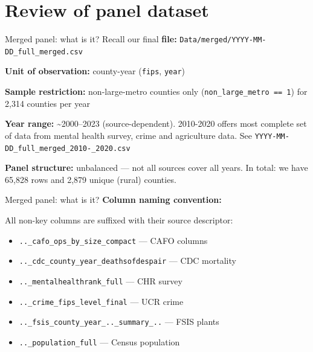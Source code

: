\documentclass[aspectratio=169]{beamer}
\begin{document}
\section{Review of panel dataset}


\begin{frame}{Merged panel: what is it?}
Recall our final \textbf{file:} \texttt{Data/merged/YYYY-MM-DD\_full\_merged.csv}

\vspace{0.5em}
\textbf{Unit of observation:} county-year (\texttt{fips}, \texttt{year})



\textbf{Sample restriction:} non-large-metro counties only (\texttt{non\_large\_metro == 1}) for 2,314 counties per year 

\textbf{Year range:} \textasciitilde2000--2023 (source-dependent). 2010-2020 offers most complete set of data from mental health survey, crime and agriculture data. See \texttt{YYYY-MM-DD\_full\_merged\_2010-\_2020.csv}

\textbf{Panel structure:} unbalanced — not all sources cover all years. In total: we have 65,828 rows and 2,879 unique (rural) counties.



\end{frame}


\begin{frame}{Merged panel: what is it?}
\textbf{Column naming convention:}

All non-key columns are suffixed with their source descriptor:
\begin{itemize}\small
    \item \texttt{..\_cafo\_ops\_by\_size\_compact} — CAFO columns
    \item \texttt{..\_cdc\_county\_year\_deathsofdespair} — CDC mortality
    \item \texttt{..\_mentalhealthrank\_full} — CHR survey
    \item \texttt{..\_crime\_fips\_level\_final} — UCR crime
    \item \texttt{..\_fsis\_county\_year\_..\_summary\_..} — FSIS plants
    \item \texttt{..\_population\_full} — Census population
\end{itemize}
\end{frame}
\end{document}
